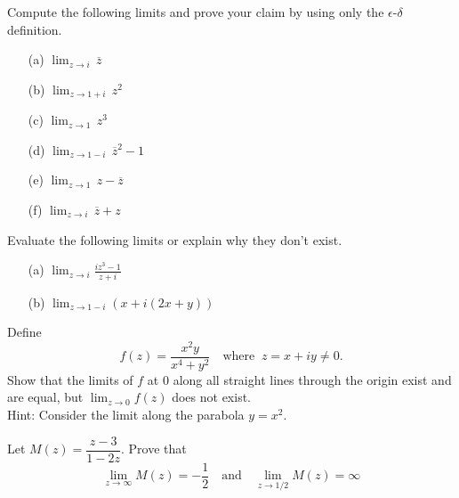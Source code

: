 \begin{problem}\label{prob 5.1}
Compute the following limits and prove your claim by using only the $\epsilon$-$\delta$ definition.
\begin{multicols}{2}
\begin{itemize}
\item[(a)] $\displaystyle \lim_{z \to i}\,\overline{z}$
\item[(b)] $\displaystyle \lim_{z \to 1+i}\,z^2$
\item[(c)] $\displaystyle \lim_{z \to 1}\,z^3$
\item[(d)] $\displaystyle \lim_{z \to 1 - i}\,\overline{z}^2 - 1$
\item[(e)] $\displaystyle \lim_{z \to 1}\,z - \overline{z}$
\item[(f)] $\displaystyle \lim_{z \to i}\,\overline{z} + z$
\end{itemize}
\end{multicols}
\end{problem}

\vspace{0.1in}

\begin{problem}\label{prob 5.2}
Evaluate the following limits or explain why they don't exist.
\begin{multicols}{2}
\begin{itemize}
\item[(a)] $\displaystyle \lim_{z\to i}\frac{iz^3 - 1}{z + i}$
\item[(b)] $\displaystyle \lim_{z\to 1-i} (x + i(2x + y))$
\end{itemize}
\end{multicols}
\end{problem}

\vspace{0.1in}

\begin{problem}\label{prob 5.3}
Define
\[f(z) = \frac{x^2y}{x^4 + y^2} \quad \text{where }\  z = x + iy \neq 0.\]
Show that the limits of $f$ at $0$ along all straight lines through the origin exist and are equal, but $\lim_{z \to 0}f(z)$ does not exist.\\[0.5em]
{\footnotesize Hint: Consider the limit along the parabola $y = x^2$.}
\end{problem}

\vspace{0.1in}

\begin{problem}\label{prob 5.4}
Let $M(z) = \dfrac{z - 3}{1 - 2z}$. Prove that
\[\lim_{z\to \infty} M(z) = -\frac{1}{2} \quad \text{and} \quad \lim_{z \to 1/2} M(z) = \infty\]
\end{problem}

